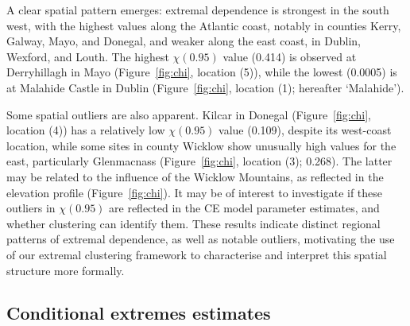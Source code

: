 \documentclass[12pt,compact]{article}
\begin{document}
A clear spatial pattern emerges: extremal dependence is strongest in the south west, with the highest values along the Atlantic coast, notably in counties Kerry, Galway, Mayo, and Donegal, and weaker along the east coast, in Dublin, Wexford, and Louth. 
The highest $\chi(0.95)$ value (0.414) is observed at Derryhillagh in Mayo (Figure~\ref{fig:chi}, location (5)), while the lowest (0.0005) is at Malahide Castle in Dublin (Figure~\ref{fig:chi}, location (1); hereafter `Malahide').

Some spatial outliers are also apparent. 
Kilcar in Donegal (Figure~\ref{fig:chi}, location (4)) has a relatively low $\chi(0.95)$ value (0.109), despite its west-coast location, while some sites in county Wicklow show unusually high values for the east, particularly Glenmacnass (Figure~\ref{fig:chi}, location (3); 0.268).
The latter may be related to the influence of the Wicklow Mountains, as reflected in the elevation profile (Figure~\ref{fig:chi}). 
It may be of interest to investigate if these outliers in $\chi(0.95)$ are reflected in the CE model parameter estimates, and whether clustering can identify them.
These results indicate distinct regional patterns of extremal dependence, as well as notable outliers, motivating the use of our extremal clustering framework to characterise and interpret this spatial structure more formally. %

\subsection{Conditional extremes estimates}
\label{subsec:app_ce}
\end{document}
